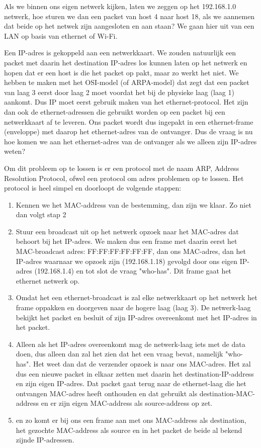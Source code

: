 Als we binnen ons eigen netwerk kijken, laten we zeggen op het 192.168.1.0 netwerk, hoe sturen we dan een packet van host 4 naar host 18, als we aannemen dat beide op het netwek zijn aangesloten en aan staan? We gaan hier uit van een LAN op basis van ethernet of Wi-Fi.

Een IP-adres is gekoppeld aan een netwerkkaart. We zouden natuurlijk een packet met daarin het destination IP-adres los kunnen laten op het netwerk en hopen dat er een host is die het packet op pakt, maar zo werkt het niet. We hebben te maken met het OSI-model (of ARPA-model) dat zegt dat een packet van laag 3 eerst door laag 2 moet voordat het bij de physieke laag (laag 1) aankomt. Dus IP moet eerst gebruik maken van het ethernet-protocol. Het zijn dan ook de ethernet-adressen die gebruikt worden op een packet bij een netwerkkaart af te leveren. Ons packet wordt dus ingepakt in een ethernet-frame (enveloppe) met daarop het ethernet-adres van de ontvanger. Dus de vraag is nu hoe komen we aan het ethernet-adres van de ontvanger als we alleen zijn IP-adres weten?

Om dit probleem op te lossen is er een protocol met de naam ARP, Address Resolution Protocol, ofwel een protocol om adres problemen op te lossen. Het protocol is heel simpel en doorloopt de volgende stappen:
\begin{enumerate}
\item Kennen we het MAC-address van de bestemming, dan zijn we klaar. Zo niet dan volgt stap 2
\item Stuur een broadcast uit op het netwerk opzoek naar het MAC-adres dat behoort bij het IP-adres. We maken dus een frame met daarin eerst het MAC-broadcast adres: FF:FF:FF:FF:FF:FF, dan ons MAC-adres, dan het IP-adres waarnaar we opzoek zijn (192.168.1.18) gevolgd door ons eigen IP-adres (192.168.1.4) en tot slot de vraag "who-has". Dit frame gaat het ethernet netwerk op.
\item Omdat het een ethernet-broadcast is zal elke netwerkkaart op het netwerk het frame oppakken en doorgeven naar de hogere laag (laag 3). De netwerk-laag bekijkt het packet en besluit of zijn IP-adres overeenkomt met het IP-adres in het packet.
\item Alleen als het IP-adres overeenkomt mag de netwerk-laag iets met de data doen, dus alleen dan zal het zien dat het een vraag bevat, namelijk "who-has". Het weet dan dat de verzender opzoek is naar ons MAC-adres. Het zal dus een nieuwe packet in elkaar zetten met daarin het destination-IP-address en zijn eigen IP-adres. Dat packet gaat terug naar de ethernet-laag die het ontvangen MAC-adres heeft onthouden en dat gebruikt als destination-MAC-address en er zijn eigen MAC-address als source-address op zet.
\item en zo komt er bij ons een frame aan met ons MAC-address als destination, het gezochte MAC-address als source en in het packet de beide al bekend zijnde IP-adressen.
\end{enumerate}


